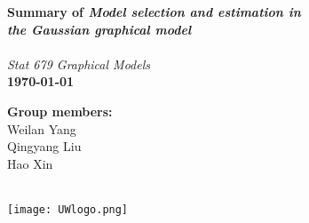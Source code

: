 
\vspace{-2cm} %

\begin{minipage}[b]{0.55\linewidth}
\Huge \color{NavyBlue} \textbf{Summary of \emph{Model selection and estimation in \\ the Gaussian graphical model}} \color{Black}\\ %
\\[0.1cm] 
\Large \textit{Stat 679 Graphical Models}\\[0.15cm] %
\large \textbf{\today}\\ %
\end{minipage}
%
%
\begin{minipage}[b]{0.25\linewidth}
\color{DarkSlateGray}\Large \textbf{Group members:}\\
Weilan Yang\\ 
Qingyang Liu\\
Hao Xin\\\\
\end{minipage}
%
\begin{minipage}[b]{0.19\linewidth}
\texttt{[image: UWlogo.png]} %
\end{minipage}

\vspace{0.5cm} %

